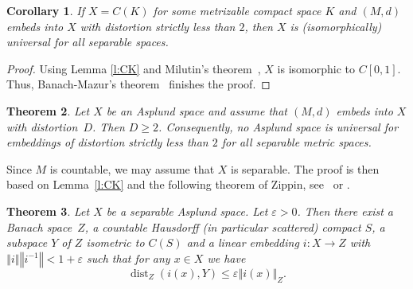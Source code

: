 \documentclass[english,a4paper,12pt]{amsart}
\newcommand{\dist}{\mathop{\mathrm{dist}}\nolimits}
\newcommand{\norm}[1]{\left\Vert#1\right\Vert}
\theoremstyle{plain}
\newtheorem{thm}{Theorem}
\newtheorem{cor}[thm]{Corollary}
\theoremstyle{definition}
\begin{document}
\begin{cor}
 If $X=C(K)$ for some \emph{metrizable} compact space $K$ and $(M,d)$ embeds into $X$ with distortion strictly less than $2$, then $X$ is (isomorphically) universal for all separable spaces.
\end{cor}
\begin{proof}
Using Lemma \ref{l:CK} and Milutin's theorem~\cite{Rosenthal,AlbiacKalton}, $X$ is isomorphic to $C[0,1]$. Thus,  Banach-Mazur's theorem~\cite{AlbiacKalton} finishes the proof.
\end{proof}

\begin{thm}\label{t:Main}
 Let $X$ be an Asplund space and assume that $(M,d)$ embeds into $X$ with distortion~$D$. Then $D\geq 2$. Consequently, no Asplund space is universal for embeddings of distortion strictly less than $2$ for all separable metric spaces.
\end{thm}
Since $M$ is countable, we may assume that $X$ is separable.
The proof is then based on Lemma~\ref{l:CK} and the following theorem of Zippin, see~\cite[Theorem~1.2]{Zippin} or \cite[Lemma~5.11]{Rosenthal}.
\begin{thm}
 Let $X$ be a separable Asplund space. Let $\varepsilon>0$. Then there exist a Banach space~$Z$, a countable Hausdorff (in particular scattered) compact $S$, a subspace $Y$ of $Z$ isometric to $C(S)$ and a linear embedding $i:X \to Z$ with $\norm{i}\norm{i^{-1}}<1+\varepsilon$ such that for any $x\in X$ we have 
\[  
\dist_Z(i(x),Y)\leq \varepsilon\norm{i(x)}_Z. 
\] 
\end{thm}
\end{document}
